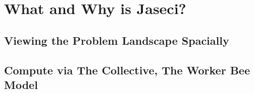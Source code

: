 \chapter{What and Why is Jaseci?}
\section{Viewing the Problem Landscape Spacially}
\section{Compute via The Collective, The Worker Bee Model}